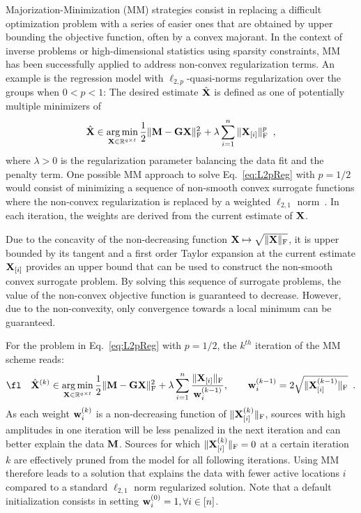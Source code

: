 Majorization-Minimization (MM) strategies consist in replacing a difficult
optimization problem with a series of easier ones that are obtained by
upper bounding the objective function, often by a convex majorant.
%
In the context of inverse problems or high-dimensional statistics using sparsity constraints,
MM has been successfully applied to address non-convex regularization terms.
An example is the regression model with $\ell_{2,p}$-quasi-norms regularization
over the groups when $0<p<1$: The desired estimate $\hat{\mathbf{X}}$ is defined as one of potentially multiple minimizers of
\begin{equation} \label{eq:L2pReg}
\hat{\mathbf{X}} \in \mathop{\mathrm{arg}\,\mathrm{min}}_{\mathbf{X}\in\mathbb{R}^{q \times t}} \frac{1}{2} \|{\mathbf{M} - \mathbf{G} \mathbf{X}}\|_{\rm F}^2  + \lambda \sum_{i=1}^n \|{\mathbf{X}_{[i]}}\|_{\rm F}^p \enspace,
\end{equation}
where $\lambda > 0$ is the regularization parameter balancing the data fit and the penalty term. One possible MM approach to solve Eq.~\ref{eq:L2pReg} with $p=1/2$ would consist of minimizing a sequence of non-smooth convex surrogate functions where the non-convex regularization is replaced by a weighted $\ell_{2,1}$ norm~\cite{strohmeier-etal:16}. In each iteration, the weights are derived from the current estimate of $\mathbf{X}$.

Due to the concavity of the non-decreasing function $\mathbf{X}\mapsto\sqrt{\|{\mathbf{X}}\|_{\rm F}}$, it is upper bounded by its tangent and a first order Taylor expansion at the current estimate $\mathbf{X}_{[i]}$ provides an upper bound that can be used to construct the non-smooth convex surrogate problem. By solving this sequence of surrogate problems, the value of the non-convex objective function is guaranteed to decrease. However, due to the non-convexity, only convergence towards a local minimum can be guaranteed.


For the problem in Eq.~\ref{eq:L2pReg}
 with $p=1/2$, the $k^{th}$ iteration of the MM scheme reads:
\begin{eqnarray}
\label{eq:MM}
\fl \quad \hat{\bfX}^{(k)} \in \argmin_{\bfX\in\R^{q \times t}} \frac{1}{2} \fronormsq{\bfM - \bfG \bfX}  + \lambda \sum_{i=1}^n \frac{ \fronorm{\bfX_{[i]}} }{ \bfw^{(k-1)}_{i}}, \qquad \bfw^{(k-1)}_{i} = 2 \sqrt{\fronorm{\bfX^{(k-1)}_{[i]}}} \enspace.
\end{eqnarray}
As each weight $\mathbf{w}^{(k)}_{i}$ is a non-decreasing function of $\|{\mathbf{X}^{(k)}_{[i]}}\|_{\rm F}$, sources with high amplitudes in one iteration will be less penalized in the next iteration and can better explain the data $\mathbf{M}$. Sources for which $\|{\mathbf{X}^{(k)}_{[i]}}\|_{\rm F} = 0$ at a certain iteration $k$ are effectively pruned from the model for all following iterations. Using MM therefore leads to a solution that explains the data with fewer active  locations $i$ compared to a standard $\ell_{2,1}$ norm regularized solution.
Note that a default initialization consists in setting $\mathbf{w}^{(0)}_{i}=1, \forall i \in [n]$.

